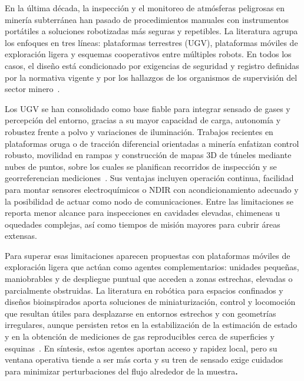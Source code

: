 En la última década, la inspección y el monitoreo de atmósferas peligrosas en minería subterránea han pasado de procedimientos manuales con instrumentos portátiles a soluciones robotizadas más seguras y repetibles. La literatura agrupa los enfoques en tres líneas: plataformas terrestres (UGV), plataformas móviles de exploración ligera y esquemas cooperativos entre múltiples robots. En todos los casos, el diseño está condicionado por exigencias de seguridad y registro definidas por la normativa vigente y por los hallazgos de los organismos de supervisión del sector minero~\cite{MINEM_DS024_2016,OSINERGMIN_BoletinGSM_2020,OSINERGMIN_BoletinGSM_2020b}.

Los UGV se han consolidado como base fiable para integrar sensado de gases y percepción del entorno, gracias a su mayor capacidad de carga, autonomía y robustez frente a polvo y variaciones de iluminación. Trabajos recientes en plataformas oruga o de tracción diferencial orientadas a minería enfatizan control robusto, movilidad en rampas y construcción de mapas 3D de túneles mediante nubes de puntos, sobre los cuales se planifican recorridos de inspección y se georreferencian mediciones~\cite{AdaptiveControl_Mines_2024,KimChoi_2025_MineMapping,AdvancesMining_2023}. Sus ventajas incluyen operación continua, facilidad para montar sensores electroquímicos o NDIR con acondicionamiento adecuado y la posibilidad de actuar como nodo de comunicaciones. Entre las limitaciones se reporta menor alcance para inspecciones en cavidades elevadas, chimeneas u oquedades complejas, así como tiempos de misión mayores para cubrir áreas extensas.

Para superar esas limitaciones aparecen propuestas con plataformas móviles de exploración ligera que actúan como agentes complementarios: unidades pequeñas, maniobrables y de despliegue puntual que acceden a zonas estrechas, elevadas o parcialmente obstruidas. La literatura en robótica para espacios confinados y diseños bioinspirados aporta soluciones de miniaturización, control y locomoción que resultan útiles para desplazarse en entornos estrechos y con geometrías irregulares, aunque persisten retos en la estabilización de la estimación de estado y en la obtención de mediciones de gas reproducibles cerca de superficies y esquinas~\cite{InsectInspired_2020,FlappingFlight_2021,AdvancesMining_2023}. En síntesis, estos agentes aportan acceso y rapidez local, pero su ventana operativa tiende a ser más corta y su tren de sensado exige cuidados para minimizar perturbaciones del flujo alrededor\textbf{ }de la muestra\textbf{.}

